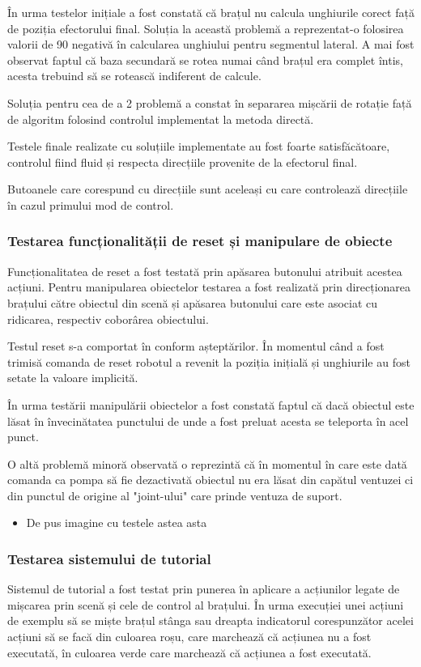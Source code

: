 În urma testelor inițiale a fost constată că brațul nu calcula unghiurile corect față de poziția efectorului final. Soluția la această problemă a reprezentat-o folosirea valorii de 90 negativă în calcularea unghiului pentru segmentul lateral. A mai fost observat faptul că baza secundară se rotea numai când brațul era complet întis, acesta trebuind să se rotească indiferent de calcule.

Soluția pentru cea de a 2 problemă a constat în separarea mișcării de rotație față de algoritm folosind controlul implementat la metoda directă.

Testele finale realizate cu soluțiile implementate au fost foarte satisfăcătoare, controlul fiind fluid și respecta direcțiile provenite de la efectorul final.

Butoanele care corespund cu direcțiile sunt aceleași cu care controlează direcțiile în cazul primului mod de control.

\subsubsection{Testarea funcționalității de reset și manipulare de obiecte}
Funcționalitatea de reset a fost testată prin apăsarea butonului atribuit acestea acțiuni. Pentru manipularea obiectelor testarea a fost realizată prin direcționarea brațului către obiectul din scenă și apăsarea butonului care este asociat cu ridicarea, respectiv coborârea obiectului.

Testul reset s-a comportat în conform așteptărilor. În momentul când a fost trimisă comanda de reset robotul a revenit la poziția inițială și unghiurile au fost setate la valoare implicită.

În urma testării manipulării obiectelor a fost constată faptul că dacă obiectul este lăsat în învecinătatea punctului de unde a fost preluat acesta se teleporta în acel punct.

O altă problemă minoră observată o reprezintă că în momentul în care este dată comanda ca pompa să fie dezactivată obiectul nu era lăsat din capătul ventuzei ci din punctul de origine al "joint-ului" care prinde ventuza de suport. 

\begin{itemize}
	\item De pus imagine cu testele astea asta
\end{itemize}


\subsubsection{Testarea sistemului de tutorial}
Sistemul de tutorial a fost testat prin punerea în aplicare a acțiunilor legate de mișcarea prin scenă și cele de control al brațului. În urma execuției unei acțiuni de exemplu să se miște brațul stânga sau dreapta indicatorul corespunzător acelei acțiuni să se facă din culoarea roșu, care marchează că acțiunea nu a fost executată, în culoarea verde care marchează că acțiunea a fost executată. 

